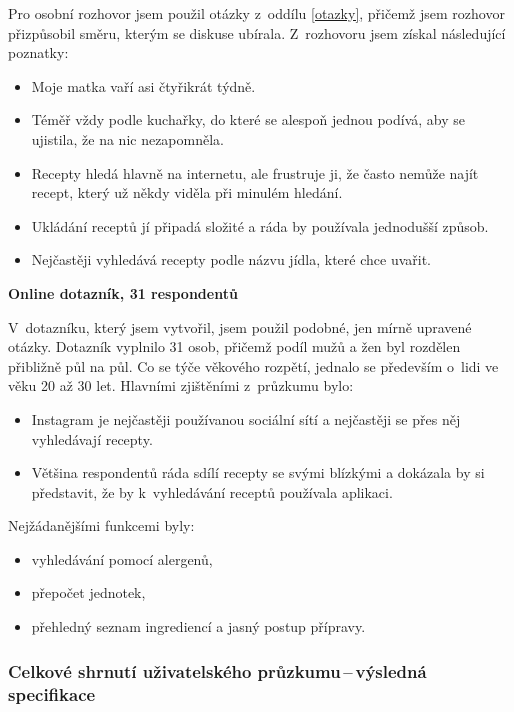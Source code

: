 \documentclass[a4paper, 11pt]{article}
\newcommand{\sss}[1]{\subsubsection{#1}} %
\begin{document}
    Pro osobní rozhovor jsem použil otázky z~oddílu \ref{otazky}, přičemž jsem rozhovor přizpůsobil směru, 
    kterým se diskuse ubírala. Z~rozhovoru jsem získal následující poznatky: 
    \begin{itemize}
        \item Moje matka vaří asi čtyřikrát týdně.
        \item Téměř vždy podle kuchařky, do které se alespoň jednou podívá, aby se ujistila, že na nic nezapomněla. 
        \item Recepty hledá hlavně na internetu, ale frustruje ji, že často nemůže najít recept, který už někdy viděla
        při minulém hledání. 
        \item Ukládání receptů jí připadá složité a ráda by používala jednodušší způsob. 
        \item Nejčastěji vyhledává recepty podle názvu jídla, které chce uvařit.
    \end{itemize}

    \noindent\textbf{Online dotazník, 31 respondentů}

    V~dotazníku, který jsem vytvořil, jsem použil podobné, jen mírně upravené otázky. Dotazník vyplnilo 31 osob, přičemž 
    podíl mužů a žen byl rozdělen přibližně půl na půl. Co se týče věkového rozpětí, jednalo se především o~lidi ve věku 
    20 až 30 let. Hlavními zjištěními z~průzkumu bylo:
    \begin{itemize}
        \item Instagram je nejčastěji používanou sociální sítí a nejčastěji se přes něj vyhledávají recepty. 
        \item Většina respondentů ráda sdílí recepty se svými blízkými a dokázala by si představit, 
        že by k~vyhledávání receptů používala aplikaci. 
    \end{itemize}
    Nejžádanějšími funkcemi byly:
    \begin{itemize}
        \item vyhledávání pomocí alergenů, 
        \item přepočet jednotek, 
        \item přehledný seznam ingrediencí a jasný postup přípravy.
    \end{itemize}

    \sss{Celkové shrnutí uživatelského průzkumu\,--\,výsledná specifikace}\label{user_sum}
\end{document}
